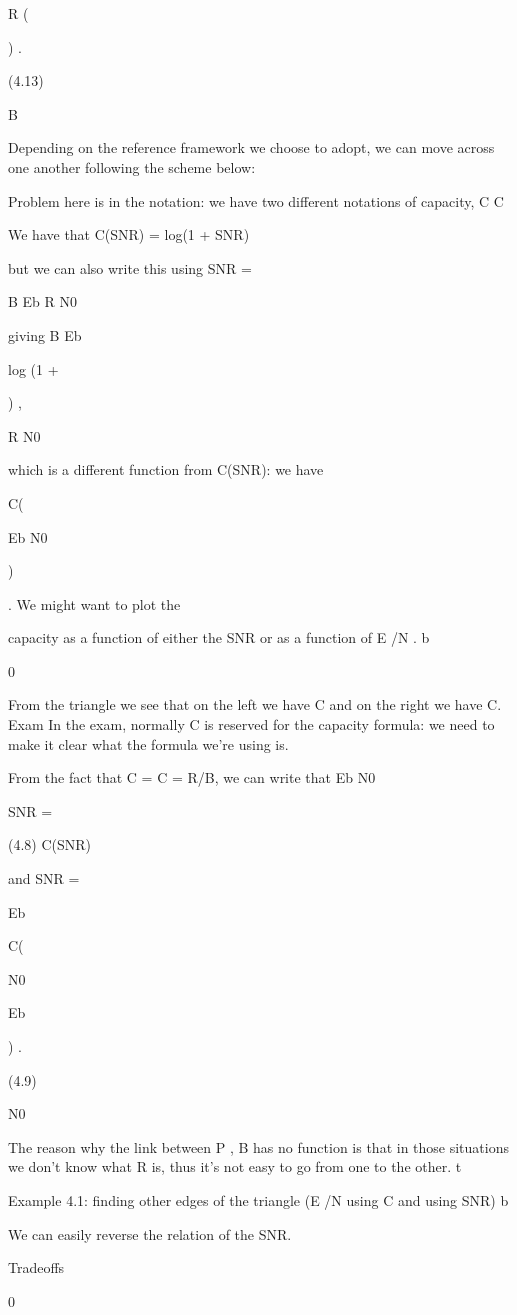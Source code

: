 {{{{{R
(

) .

(4.13)

B

Depending on the reference framework we choose to adopt, we can move across one another following the scheme below:

Problem here is in the notation: we have two different notations of capacity, C \neq C

We have that C(SNR) = log(1 + SNR)

but we can also write this using SNR =

B Eb R N0

giving B Eb

log (1 +

) ,

R N0

which is a different function from C(SNR): we have

C(

Eb N0

)

. We might want to plot the

capacity as a function of either the SNR or as a function of E /N .
b

0

From the triangle we see that on the left we have C and on the right we have C.
Exam In the exam, normally C is reserved for the capacity formula: we need to make it clear what the formula we're using is.

From the fact that C = C = R/B, we can write that Eb N0

SNR
=

(4.8)
C(SNR)

and SNR =

Eb

C(

N0

Eb

) .

(4.9)

N0

The reason why the link between P , B has no function is that in those situations we don't know what R is, thus it's not easy to go from one to the other.
t

Example 4.1: finding other edges of the triangle (E /N using C and using SNR)
b

We can easily reverse the relation of the SNR.

Tradeoffs

0

}}}}}
